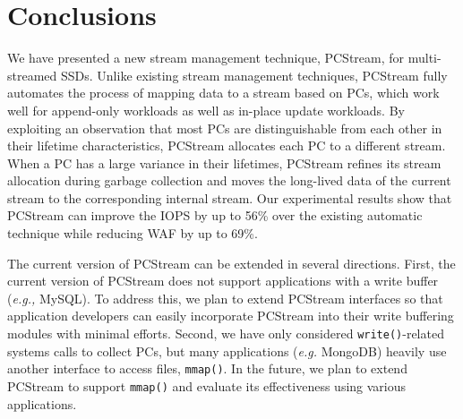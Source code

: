 \section{Conclusions}

We have presented a new stream management technique, \textsf{\small PCStream},
for multi-streamed SSDs.  Unlike existing stream management techniques,
\textsf{\small PCStream} fully automates the process of mapping data to a
stream based on PCs, which work well for append-only workloads as well as
in-place update workloads.  By exploiting an observation that most PCs are
distinguishable from each other in their lifetime characteristics,
\textsf{\small PCStream} allocates each PC to a different stream.  When a PC
has a large variance in their lifetimes, \textsf{\small PCStream} refines its
stream allocation during garbage collection and moves the long-lived data of
the current stream to the corresponding internal stream.  Our experimental
results show that \textsf{\small PCStream} can improve the IOPS by up to 56\% over 
the existing automatic technique while reducing WAF by up to 69\%. 

The current version of \textsf{\small PCStream} can be extended in several
directions.  First, the current version of PCStream does not support
applications with a write buffer ({\it e.g.,} MySQL). To address this, we plan
to extend PCStream interfaces so that application developers can easily
incorporate PCStream into their write buffering modules with minimal efforts.
Second, we have only considered \texttt{write()}-related systems calls to
collect PCs, but many applications ({\it e.g.} MongoDB) heavily use another
interface to access files, \texttt{mmap()}. In the future, we plan to extend
PCStream to support \texttt{mmap()} and evaluate its effectiveness using
various applications.
